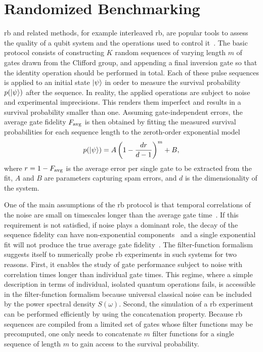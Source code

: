 \section{Randomized Benchmarking}\label{sec:ff:examples:randomized_benchmarking}
\Gls{rb} and related methods, for example interleaved \gls{rb}, are popular tools to assess the quality of a qubit system and the operations used to control it~\cite{Knill2008,Magesan2011,Magesan2012a}.
The basic protocol consists of constructing $K$ random sequences of varying length $m$ of gates drawn from the Clifford group,
and appending a final inversion gate so that the identity operation should be performed in total.
Each of these pulse sequences is applied to an initial state $\mbox{\ensuremath{\ket{\psi}}}$ in order to measure the survival probability $p(\mbox{\ensuremath{\ket{\psi}}})$ after the sequence.
In reality, the applied operations are subject to noise and experimental imprecisions.
This renders them imperfect and results in a survival probability smaller than one.
Assuming gate-independent errors, the average gate fidelity $F_{\mathrm{avg}}$ is then obtained by fitting the measured survival probabilities for each sequence length to the zeroth-order exponential model~\cite{Magesan2011}
\begin{equation}\label{eq:ff:RB}
    p(\mbox{\ensuremath{\ket{\psi}}}) = A \left(1 - \frac{dr}{d-1}\right)^m + B,
\end{equation}
where $r = 1 - F_{\mathrm{avg}}$ is the average error per single gate to be extracted from the fit, $A$ and $B$ are parameters capturing \acrshort{spam} errors, and $d$ is the dimensionality of the system.

One of the main assumptions of the \gls{rb} protocol is that temporal correlations of the noise are small on timescales longer than the average gate time~\cite{Magesan2011}.
If this requirement is not satisfied, \eg if \oneoverf noise plays a dominant role, the decay of the sequence fidelity can have non-exponential components~\cite{Epstein2014,Fogarty2015,Feng2016} and a single exponential fit will not produce the true average gate fidelity~\cite{Mavadia2018,Edmunds2020}.
The filter-function formalism suggests itself to numerically probe \gls{rb} experiments in such systems for two reasons.
First, it enables the study of gate performance subject to noise with correlation times longer than individual gate times.
This regime, where a simple description in terms of individual, isolated quantum operations fails, is accessible in the filter-function formalism because universal classical noise can be included by the power spectral density $S(\omega)$.
Second, the simulation of a \gls{rb} experiment can be performed efficiently by using the concatenation property.
Because \gls{rb} sequences are compiled from a limited set of gates whose filter functions may be precomputed, one only needs to concatenate $m$ filter functions for a single sequence of length $m$ to gain access to the survival probability.

